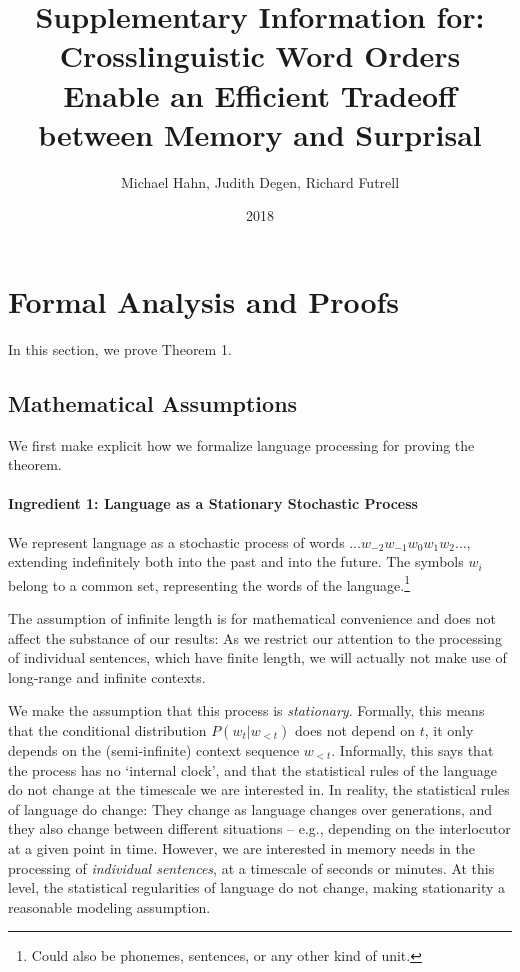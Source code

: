 \documentclass[11pt,letterpaper]{article}
\title{Supplementary Information for: Crosslinguistic Word Orders Enable an Efficient Tradeoff between Memory and Surprisal}
\author{Michael Hahn, Judith Degen, Richard Futrell}
\date{2018}
\newcounter{theorem}
\begin{document}
\maketitle

\tableofcontents


%
%
%


\section{Formal Analysis and Proofs}

In this section, we prove Theorem 1.

\subsection{Mathematical Assumptions}

We first make explicit how we formalize language processing for proving the theorem.


\paragraph{Ingredient 1: Language as a Stationary Stochastic Process}
We represent language as a stochastic process of words $\dots w_{-2} w_{-1} w_0 w_{1} w_{2} \dots$, extending indefinitely both into the past and into the future.
The symbols $w_i$ belong to a common set, representing the words of the language.\footnote{Could also be phonemes, sentences, or any other kind of unit.}


The assumption of infinite length is for mathematical convenience and does not affect the substance of our results:
As we restrict our attention to the processing of individual sentences, which have finite length, we will actually not make use of long-range and infinite contexts.

We make the assumption that this process is \emph{stationary}.
Formally, this means that the conditional distribution $P(w_t|w_{<t})$ does not depend on $t$, it only depends on the (semi-infinite) context sequence $w_{<t}$.
Informally, this says that the process has no `internal clock', and that the statistical rules of the language do not change at the timescale we are interested in.
In reality, the statistical rules of language do change: They change as language changes over generations, and they also change between different situations -- e.g., depending on the interlocutor at a given point in time.
However, we are interested in memory needs in the processing of \emph{individual sentences}, at a timescale of seconds or minutes.
At this level, the statistical regularities of language do not change, making stationarity a reasonable modeling assumption.
\end{document}
